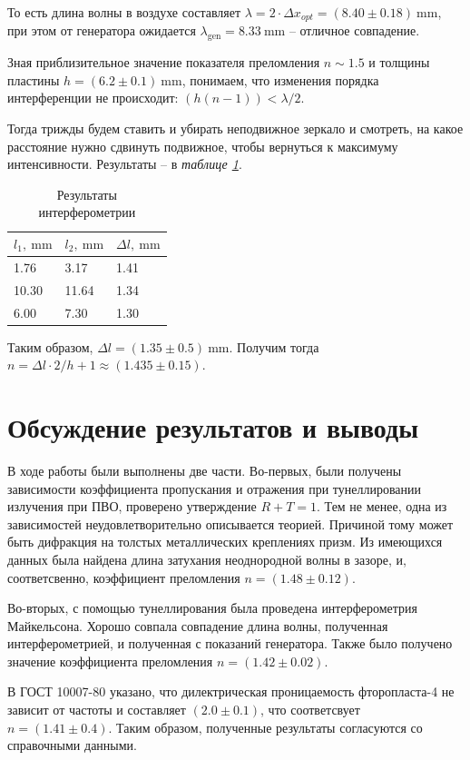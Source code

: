 \documentclass[12pt, a4paper]{article}
\newcommand{\mim}{~\mathrm{mm}}
\begin{document}
То есть длина волны в воздухе составляет $\lambda = 2\cdot\Delta x_{opt} = (8.40\pm0.18) \mim$, при этом от генератора ожидается 
$\lambda_\text{gen} = 8.33 \mim$ -- отличное совпадение.

Зная приблизительное значение показателя преломления $n\sim1.5$ и толщины пластины $h=(6.2\pm0.1)\mim$, понимаем, что изменения 
порядка интерференции не происходит: $(h(n-1)) < \lambda/2$.

Тогда трижды будем ставить и убирать неподвижное зеркало и смотреть, на какое расстояние нужно сдвинуть подвижное, чтобы вернуться
к максимуму интенсивности. Результаты -- в \textit{таблице \ref{table:interferention}}.

\begin{table}[H]
  \begin{tabular}{|l|l|l|}
  \hline
  $l_1, \mim$  &  $l_2, \mim$  & $\Delta l, \mim$     \\ \hline
  1.76  & 3.17  & 1.41 \\ \hline
  10.30 & 11.64 & 1.34 \\ \hline
  6.00  & 7.30  & 1.30 \\ \hline
  \end{tabular}
  \caption{Результаты интерферометрии}
  \label{table:interferention}
\end{table}
Таким образом, $\Delta l = (1.35\pm0.5)\mim$.
Получим тогда $n =  \Delta l \cdot 2 / h + 1 \approx (1.435\pm0.15)$.

\section{Обсуждение результатов и выводы}
В ходе работы были выполнены две части. 
Во-первых, были получены зависимости коэффициента пропускания и отражения при тунеллировании
излучения при ПВО, проверено утверждение $R+T=1$. Тем не менее, одна из зависимостей неудовлетворительно описывается теорией.
Причиной тому может быть дифракция на толстых металлических креплениях призм. Из имеющихся данных была найдена длина затухания
неоднородной волны в зазоре, и, соответсвенно, коэффициент преломления $n = (1.48 \pm 0.12)$. 

Во-вторых, с помощью тунеллирования была проведена интерферометрия Майкельсона. Хорошо совпала совпадение длина волны, полученная
интерферометрией, и полученная с показаний генератора. Также было получено значение коэффициента преломления $n=(1.42\pm 0.02)$.

В ГОСТ 10007-80 указано, что дилектрическая проницаемость фторопласта-4 не зависит от частоты и составляет $(2.0\pm0.1)$, что соответсвует
$n=(1.41\pm0.4)$. Таким образом, полученные результаты согласуются со справочными данными.
\end{document}
